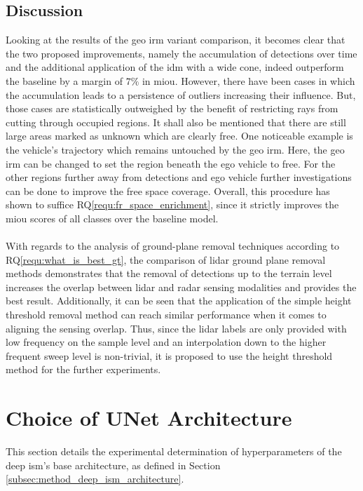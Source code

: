\subsection{Discussion}
\label{subsec:discussion_gt}
Looking at the results of the geo \gls{irm} variant comparison, it becomes clear that the two proposed improvements, namely the accumulation of detections over time and the additional application of the \gls{idm} with a wide cone, indeed outperform the baseline by a margin of $7\%$ in m\gls{iou}. However, there have been cases in which the accumulation leads to a persistence of outliers increasing their influence. But, those cases are statistically outweighed by the benefit of restricting rays from cutting through occupied regions. It shall also be mentioned that there are still large areas marked as unknown which are clearly free. One noticeable example is the vehicle's trajectory which remains untouched by the geo \gls{irm}. Here, the geo \gls{irm} can be changed to set the region beneath the ego vehicle to free. For the other regions further away from detections and ego vehicle further investigations can be done to improve the free space coverage. Overall, this procedure has shown to suffice RQ\ref{requ:fr_space_enrichment}, since it strictly improves the m\gls{iou} scores of all classes over the baseline model.
\\\\
With regards to the analysis of ground-plane removal techniques according to RQ\ref{requ:what_is_best_gt}, the comparison of lidar ground plane removal methods demonstrates that the removal of detections up to the terrain level increases the overlap between lidar and radar sensing modalities and provides the best result. Additionally, it can be seen that the application of the simple height threshold removal method can reach similar performance when it comes to aligning the sensing overlap. Thus, since the lidar labels are only provided with low frequency on the sample level and an interpolation down to the higher frequent sweep level is non-trivial, it is proposed to use the height threshold method for the further experiments. 
%
\section{Choice of UNet Architecture}
\label{sec:choice_of_unet_arch}
This section details the experimental determination of hyperparameters of the deep \gls{ism}'s base architecture, as defined in Section \ref{subsec:method_deep_ism_architecture}.
%

